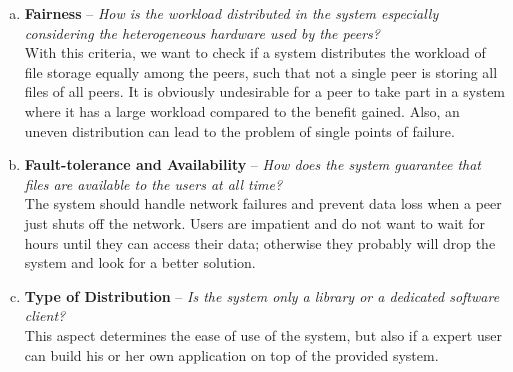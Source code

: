 \begin{enumerate}[(a)]
\item \textbf{Fairness} -- \textit{How is the workload distributed in the system especially considering the heterogeneous hardware used by the peers?}\\
With this criteria, we want to check if a system distributes the workload of file storage equally among the peers, such that not a single peer is storing all files of all peers. It is obviously undesirable for a peer to take part in a system where it has a large workload compared to the benefit gained. Also, an uneven distribution can lead to the problem of single points of failure.

\item \textbf{Fault-tolerance and Availability} -- \textit{How does the system guarantee that files are available to the users at all time?}\\
The system should handle network failures and prevent data loss when a peer just shuts off the network. Users are impatient and do not want to wait for hours until they can access their data; otherwise they probably will drop the system and look for a better solution.

\item \textbf{Type of Distribution} -- \textit{Is the system only a library or a dedicated software client?}\\
This aspect determines the ease of use of the system, but also if a expert user can build his or her own application on top of the provided system.


\end{enumerate}
